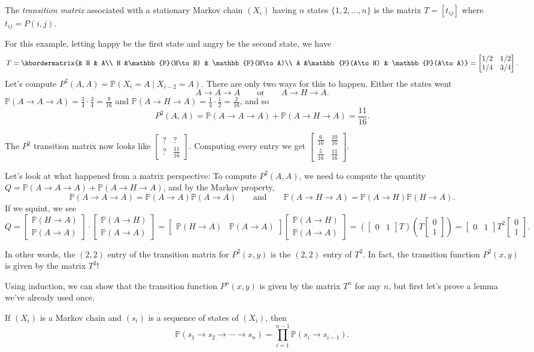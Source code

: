 \documentclass{problemset}
\newcommand{\mat}[1]{\begin{bmatrix}#1\end{bmatrix}}
\newcommand{\1}{\mathbf{1}}
\renewcommand{\P}{\mathbb{P}}
\begin{document}
	\begin{definition}
		The \emph{transition matrix} associated with a stationary Markov chain $(X_i)$ having
		$n$ states $\{1,2,\ldots, n\}$ is the matrix $T=[t_{ij}]$ where $t_{ij}=P(i,j)$.
	\end{definition}

	For this example, letting happy be the first state and angry be the second state, we have
	\[
		T=\kbordermatrix{& H & A\\ H &\P(H\to H) & \P(H\to A)\\ A &\P(A\to H) & \P(A\to A)}=\mat{1/2&1/2\\1/4&3/4}.
	\]
	Let's compute $P^2(A,A)=\P(X_i=A\mid X_{i-2}=A)$.  There are only two ways for this to happen.  Either
	the states went 
	\[
		A\to A\to A\qquad\text{or}\qquad A\to H\to A.
	\]
	$\P(A\to A\to A) = \frac{3}{4}\cdot \frac{3}{4} = \frac{9}{16}$ and $\P(A\to H\to A) = \frac{1}{4}\cdot \frac{1}{2}=\frac{2}{16}$,
	and so
	\[
		P^2(A,A) = \P(A\to A\to A)+\P(A\to H\to A) = \frac{11}{16}.
	\]

	The $P^2$ transition matrix now looks like $\mat{?&?\\?&\frac{11}{16}}$.  Computing every
	entry we get $\mat{\frac{6}{16}&\frac{10}{16}\\\frac{5}{16}&\frac{11}{16}}$.


	Let's look at what happened from a matrix perspective:  To compute $P^2(A,A)$, we
	need to compute the quantity $Q=\P(A\to A\to A)+\P(A\to H\to A)$, and by the 
	Markov property,
	\[
		\P(A\to A\to A) =  \P(A\to A)\P( A\to A)
		\qquad\text{and}\qquad
		\P(A\to H\to A) =  \P(A\to H)\P( H\to A).
	\]
	If we squint, we see
	\[
		Q=\mat{\P( H\to A)\\ \P(A\to A)}\cdot \mat{\P(A\to H)\\\P(A\to A)}
		=\mat{\P( H\to A) & \P(A\to A)} \mat{\P(A\to H)\\\P(A\to A)}
		=(\mat{0&1}T)\left(T\mat{0\\1}\right) = \mat{0&1}T^2\mat{0\\1}.
	\]

	In other words, the $(2,2)$ entry of the transition matrix for $P^2(x,y)$ is the
	$(2,2)$ entry of $T^2$.  In fact, the transition function $P^2(x,y)$ is given by the
	matrix $T^2$!

	Using induction, we can show that the transition function $P^n(x,y)$ is given by
	the matrix $T^n$ for any $n$, but first let's prove a lemma we've already used once.

	\begin{lemma}
		If $(X_i)$ is a Markov chain and $(s_i)$ is a sequence of states of $(X_i)$, then
		\[
			\P(s_1\to s_2\to\cdots \to s_n) = \prod_{i=1}^{n-1} \P(s_i\to s_{i-1}).
		\]
	\end{lemma}
	
\end{document}
